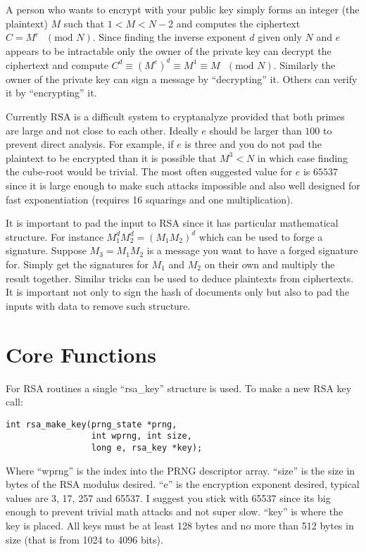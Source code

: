 \documentclass{book}
\begin{document}
A person who wants to encrypt with your public key simply forms an integer (the plaintext) $M$ such that 
$1 < M < N-2$ and computes the ciphertext $C = M^e\mbox{ }(\mbox{mod }N)$.  Since finding the inverse exponent $d$
given only $N$ and $e$ appears to be intractable only the owner of the private key can decrypt the ciphertext and compute
$C^d \equiv \left (M^e \right)^d \equiv M^1 \equiv M\mbox{ }(\mbox{mod }N)$.  Similarly the owner of the private key 
can sign a message by ``decrypting'' it.  Others can verify it by ``encrypting'' it.  

Currently RSA is a difficult system to cryptanalyze provided that both primes are large and not close to each other.  
Ideally $e$ should be larger than $100$ to prevent direct analysis.  For example, if $e$ is three and you do not pad
the plaintext to be encrypted than it is possible that $M^3 < N$ in which case finding the cube-root would be trivial.  
The most often suggested value for $e$ is $65537$ since it is large enough to make such attacks impossible and also well 
designed for fast exponentiation (requires 16 squarings and one multiplication).

It is important to pad the input to RSA since it has particular mathematical structure.  For instance  
$M_1^dM_2^d = (M_1M_2)^d$ which can be used to forge a signature.  Suppose $M_3 = M_1M_2$ is a message you want
to have a forged signature for.  Simply get the signatures for $M_1$ and $M_2$ on their own and multiply the result
together.  Similar tricks can be used to deduce plaintexts from ciphertexts.  It is important not only to sign 
the hash of documents only but also to pad the inputs with data to remove such structure.  

\section{Core Functions}

For RSA routines a single ``rsa\_key'' structure is used.  To make a new RSA key call:
\begin{verbatim}
int rsa_make_key(prng_state *prng, 
                 int wprng, int size, 
                 long e, rsa_key *key);
\end{verbatim}

Where ``wprng'' is the index into the PRNG descriptor array.  ``size'' is the size in bytes of the RSA modulus desired.
``e'' is the encryption exponent desired, typical values are 3, 17, 257 and 65537.  I suggest you stick with 65537 since its big
enough to prevent trivial math attacks and not super slow.  ``key'' is where the key is placed.  All keys must be at 
least 128 bytes and no more than 512 bytes in size (that is from 1024 to 4096 bits).
\end{document}
